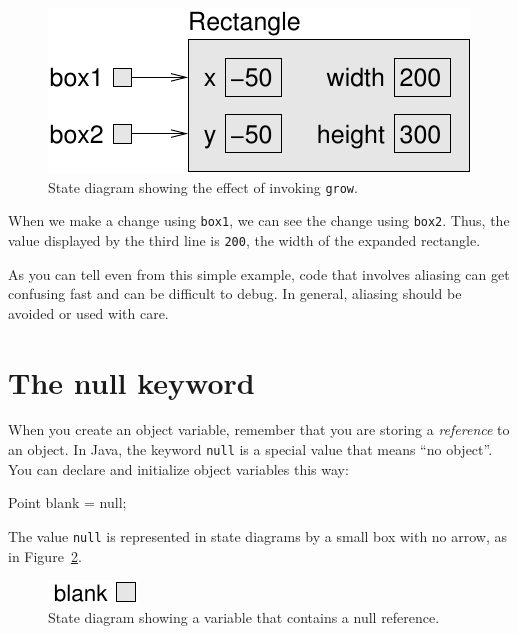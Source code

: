 \documentclass[12pt]{book}
\theoremstyle{exercise}
\newcommand{\java}[1]{\verb"#1"}
\begin{document}
\begin{figure}
\begin{center}
\includegraphics{figs/aliasing2.pdf}
\caption{State diagram showing the effect of invoking \java{grow}.}
\label{fig.aliasing2}
\end{center}
\end{figure}

When we make a change using \java{box1}, we can see the change using \java{box2}.
Thus, the value displayed by the third line is {\tt 200}, the width of the expanded rectangle.

As you can tell even from this simple example, code that involves aliasing can get confusing fast and can be difficult to debug.
In general, aliasing should be avoided or used with care.


\section{The null keyword}


When you create an object variable, remember that you are storing a {\em reference} to an object.
In Java, the keyword \java{null} is a special value that means ``no object''.
You can declare and initialize object variables this way:

\begin{code}
    Point blank = null;
\end{code}

The value \java{null} is represented in state diagrams by a small box with no arrow, as in Figure~\ref{fig.reference2}.

\begin{figure}
\begin{center}
\includegraphics{figs/reference2.pdf}
\caption{State diagram showing a variable that contains a null reference.}
\label{fig.reference2}
\end{center}
\end{figure}
\end{document}
